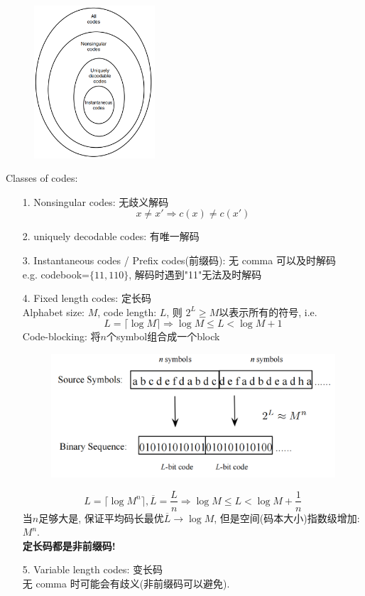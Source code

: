 \begin{figure}[htbp]
    \centering
    \includegraphics[width=0.4\textwidth]{./figures/chapter3/codes.png}
\end{figure}
Classes of codes:
\begin{itemize}
\item[1.] Nonsingular codes: 无歧义解码
$$x\neq x'\Rightarrow c(x)\neq c(x')$$
\item[2.] uniquely decodable codes: 有唯一解码
\item[3.] Instantaneous codes / Prefix codes(前缀码): 无 comma 可以及时解码 \\
e.g. codebook=$\{11,110\}$, 解码时遇到"11"无法及时解码
\item[4.] Fixed length codes: 定长码 \\
Alphabet size: $M$, code length: $L$, 则 $2^L\geq M$以表示所有的符号, i.e.
$$L=\lceil\log M\rceil\Rightarrow \log M\leq L < \log M+1$$
Code-blocking: 将$n$个symbol组合成一个block
\begin{figure}[htbp]
    \centering
    \includegraphics[width=\textwidth]{./figures/chapter3/code_blocking.png}
\end{figure}
$$L=\lceil\log M^n\rceil,\overline{L}=\dfrac{L}{n}\Rightarrow \log M\leq L < \log M+\dfrac{1}{n}$$
当$n$足够大是, 保证平均码长最优$\overline{L}\to\log M$, 但是空间(码本大小)指数级增加: $M^n$.\\
\textbf{定长码都是非前缀码!}

\item[5.] Variable length codes: 变长码 \\
无 comma 时可能会有歧义(非前缀码可以避免).
\end{itemize}